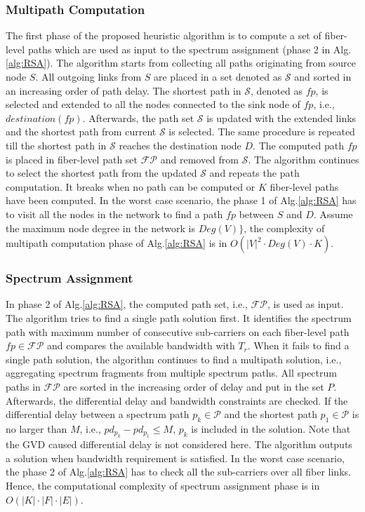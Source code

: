\documentclass[conference]{IEEEtran}
\begin{document}
\subsubsection{Multipath Computation}
The first phase of the proposed heuristic algorithm is to compute a set of fiber-level paths which are used as input to the spectrum 
assignment (phase 2 in Alg.\ref{alg:RSA}).  The algorithm starts from collecting all paths originating from source node $S$.  
All outgoing links from $S$ are placed in a set denoted as $\mathcal{S}$ and sorted in an increasing order of path delay. The shortest 
path in $\mathcal{S}$, denoted as $fp$, is selected and extended to all the nodes connected to the sink node of $fp$, i.e., $destination(fp)$. 
Afterwards, the path set $\mathcal{S}$
is updated with the extended links and  the shortest path from current $\mathcal{S}$ is selected. The same procedure is repeated 
till the shortest path in $\mathcal{S}$ reaches the destination node $D$. The computed path $fp$ is placed in fiber-level path set 
$\mathcal{FP}$ and removed from $\mathcal{S}$.
The algorithm continues to select the shortest path from the updated $\mathcal{S}$ and repeats the path computation. It breaks when no path can be computed or $K$ fiber-level paths have been computed.  
In the worst case scenario, the phase 1 of Alg.\ref{alg:RSA} has to visit all the nodes in the network to find a path $fp$ between $S$ and $D$. Assume the maximum node degree in the network  is $Deg(V)\}$, the complexity of multipath computation phase of  Alg.\ref{alg:RSA} is in $O(|V|^2 \cdot Deg(V) \cdot K) $.
 
\subsubsection{Spectrum Assignment}
In phase 2 of Alg.\ref{alg:RSA}, the computed path set, i.e., $\mathcal{FP}$, is used as input. The algorithm tries to find a single path solution first.  It identifies the spectrum path with maximum number of consecutive sub-carriers on each fiber-level path $fp\in\mathcal{FP}$ and compares the available bandwidth with $T_r$.  
When it fails to find a single path  solution, the algorithm continues to find a multipath solution, i.e., aggregating 
spectrum fragments from multiple spectrum paths. All spectrum paths in $\mathcal{FP}$ are sorted in the increasing 
order of delay and put in the set $P$. Afterwards, the differential delay and bandwidth constraints are  checked. If  the 
differential delay between a spectrum path $p_k \in \mathcal{P}$ and the shortest path $p_1 \in \mathcal{P}$ is no 
larger than $M$, i.e., $pd_{p_k} -pd_{p_1} \leq M$, $p_k$  is included in the solution. Note that the GVD caused differential delay is not considered here. The algorithm outputs a solution 
when bandwidth requirement is satisfied.   In the worst case scenario, the phase 2 of Alg.\ref{alg:RSA} has to check 
all the sub-carriers over all fiber links. Hence, the computational complexity of spectrum assignment phase is in $O(|K|\cdot |F|\cdot |E|)$.  
 
\end{document}
